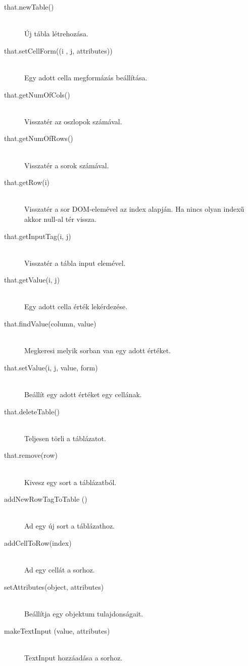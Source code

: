 \begin{description}
\begin{description}
			\item[that.newTable()] 
				\hfill \\ Új tábla létrehozása.
			\item[that.setCellForm((i , j, attributes))] 
				\hfill \\ Egy adott cella megformázás beállítása.
			\item[that.getNumOfCols()] 
			 	\hfill \\ Visszatér az oszlopok számával.
			\item[that.getNumOfRows()]
				\hfill \\ Visszatér a sorok számával.
			\item[that.getRow(i)]
				\hfill \\ Visszatér a sor DOM-elemével az index alapján.\newline
				Ha nincs olyan indexű akkor null-al tér vissza.
			\item[that.getInputTag(i, j)]
				\hfill \\ Visszatér a tábla input elemével.
			\item[that.getValue(i, j)]
				\hfill \\ Egy adott cella érték lekérdezése.
			\item[that.findValue(column, value)] 
				\hfill \\ Megkeresi melyik sorban van egy adott értéket.
			\item[that.setValue(i, j, value, form)]
				\hfill \\ Beállít egy adott értéket egy cellának.
			\item[that.deleteTable()]
				\hfill \\ Teljesen törli a táblázatot.
			\item[that.remove(row)]
				\hfill \\ Kivesz egy sort a táblázatból.
			\item[addNewRowTagToTable ()]
				\hfill \\ Ad egy új sort a táblázathoz.
			\item[addCellToRow(index)]
				\hfill \\ Ad  egy cellát a sorhoz.
			\item[setAttributes(object, attributes)]
				\hfill \\ Beállítja egy objektum tulajdonságait.
			\item[makeTextInput (value,  attributes)]
				\hfill \\  
				TextInput hozzáadása a sorhoz.
			\end{description}

\end{description}
